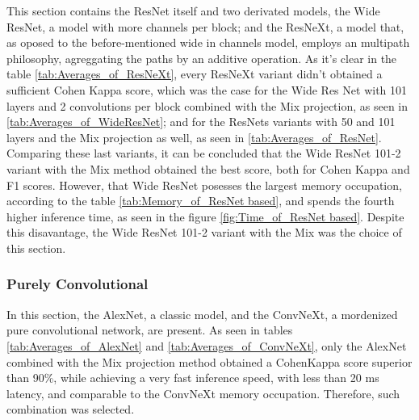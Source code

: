 This section contains the ResNet itself and two derivated models, the Wide ResNet, a model with more channels per block; and the ResNeXt, a model that, as oposed to the before-mentioned wide in channels model, employs an multipath philosophy, agreggating the paths by an additive operation. As it's clear in the table \ref{tab:Averages_of_ResNeXt}, every ResNeXt variant didn't obtained a sufficient Cohen Kappa score, which was the case for the Wide Res Net with 101 layers and 2 convolutions per block combined with the \acrshort{Mix} projection, as seen in \ref{tab:Averages_of_WideResNet}; and for the ResNets variants with 50 and 101 layers and the \acrshort{Mix} projection as well,  as seen in \ref{tab:Averages_of_ResNet}. Comparing these last variants, it can be concluded that the Wide ResNet 101-2 variant with the \acrshort{Mix} method obtained the best score, both for Cohen Kappa and F1 scores. However, that Wide ResNet posesses the largest memory occupation, according to the table \ref{tab:Memory_of_ResNet based}, and spends the fourth higher inference time, as seen in the figure \ref{fig:Time_of_ResNet based}.  Despite this disavantage, the Wide ResNet 101-2 variant with the \acrshort{Mix} was the choice of this section.

\pagebreak







\FloatBarrier

\subsubsection{Purely Convolutional}

In this section, the AlexNet, a classic model, and the ConvNeXt, a mordenized pure convolutional network, are present. As seen in tables \ref{tab:Averages_of_AlexNet} and \ref{tab:Averages_of_ConvNeXt}, only the AlexNet combined with the \acrshort{Mix} projection method obtained a CohenKappa score superior than 90\%, while achieving a very fast inference speed, with less than 20 ms latency, and comparable to the ConvNeXt memory occupation. Therefore, such combination was selected.  






